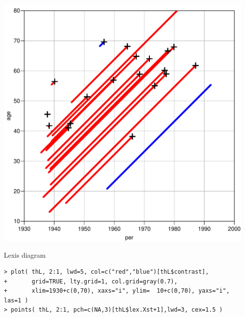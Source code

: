 \begin{frame}[fragile]
  \begin{minipage}[c]{0.50\linewidth}
\includegraphics[width=0.97\textwidth,keepaspectratio]{thL-lexis2}
  \end{minipage}
  \begin{minipage}[c]{0.48\linewidth}
\hfill \LARGE Lexis diagram
  \end{minipage}
\vspace*{-1.5ex}
{\scriptsize
\begin{verbatim}
> plot( thL, 2:1, lwd=5, col=c("red","blue")[thL$contrast],
+       grid=TRUE, lty.grid=1, col.grid=gray(0.7),
+       xlim=1930+c(0,70), xaxs="i", ylim=  10+c(0,70), yaxs="i", las=1 )
> points( thL, 2:1, pch=c(NA,3)[thL$lex.Xst+1],lwd=3, cex=1.5 )
\end{verbatim}}
\end{frame}

